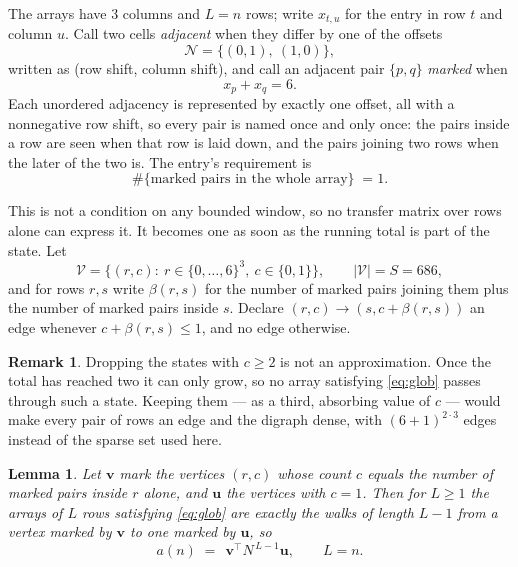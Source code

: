 \documentclass[11pt,a4paper]{article}
\theoremstyle{plain}
\newtheorem{lemma}[theorem]{Lemma}
\theoremstyle{definition}
\newtheorem{remark}[theorem]{Remark}
\begin{document}
The arrays have $3$ columns and $L=n$ rows; write $x_{t,u}$ for the entry in
row $t$ and column $u$. Call two cells \emph{adjacent} when they differ by one of the
offsets
\[
\mathcal N=\{(0,1),\ (1,0)\},
\]
written as (row shift, column shift), and call an adjacent pair $\{p,q\}$
\emph{marked} when
\[
x_{p}+x_{q}=6 .
\]
Each unordered adjacency is represented by exactly one offset, all with a nonnegative row
shift, so every pair is named once and only once: the pairs inside a row are seen when
that row is laid down, and the pairs joining two rows when the later of the two is. The
entry's requirement is
\begin{equation}\label{eq:glob}
\#\{\text{marked pairs in the whole array}\}\;=1.
\end{equation}

This is not a condition on any bounded window, so no transfer matrix over rows alone can
express it. It becomes one as soon as the running total is part of the state. Let
\[
\mathcal V=\bigl\{(r,c):\ r\in\{0,\dots,6\}^{3},\ c\in\{0,1\}\bigr\},
\qquad |\mathcal V|=S=686,
\]
and for rows $r,s$ write $\beta(r,s)$ for the number of marked pairs joining them plus the
number of marked pairs inside $s$. Declare $(r,c)\to(s,c+\beta(r,s))$ an edge whenever
$c+\beta(r,s)\le1$, and no edge otherwise.

\begin{remark}
Dropping the states with $c\ge2$ is not an approximation. Once the total has reached two it
can only grow, so no array satisfying \eqref{eq:glob} passes through such a state. Keeping
them --- as a third, absorbing value of $c$ --- would make every pair of rows an edge and
the digraph dense, with $(6+1)^{2\cdot3}$ edges instead of the sparse set used here.
\end{remark}

\begin{lemma}\label{lem:walk}
Let $\mathbf{v}$ mark the vertices $(r,c)$ whose count $c$ equals the number of marked pairs
inside $r$ alone, and $\mathbf{u}$ the vertices with $c=1$. Then for $L\ge1$ the arrays
of $L$ rows satisfying \eqref{eq:glob} are exactly the walks of length $L-1$ from a
vertex marked by $\mathbf{v}$ to one marked by $\mathbf{u}$, so
\[
a(n)\;=\;\,\mathbf{v}^{\!\top}N^{\,L-1}\mathbf{u},\qquad L=n .
\]
\end{lemma}
\end{document}
